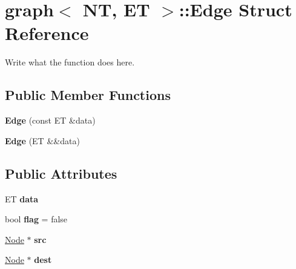 \hypertarget{structgraph_1_1Edge}{\section{graph$<$ N\+T, E\+T $>$\+:\+:Edge Struct Reference}
\label{structgraph_1_1Edge}
}


Write what the function does here.  


\subsection*{Public Member Functions}
\begin{DoxyCompactItemize}
\item 
\hypertarget{structgraph_1_1Edge_aa987146abe580e5d724db07563006fd7}{{\bfseries Edge} (const E\+T \&data)}\label{structgraph_1_1Edge_aa987146abe580e5d724db07563006fd7}

\item 
\hypertarget{structgraph_1_1Edge_af7c871c04c3b03d7e662b950a8875b24}{{\bfseries Edge} (E\+T \&\&data)}\label{structgraph_1_1Edge_af7c871c04c3b03d7e662b950a8875b24}

\end{DoxyCompactItemize}
\subsection*{Public Attributes}
\begin{DoxyCompactItemize}
\item 
\hypertarget{structgraph_1_1Edge_a7246ba3c6e705b5c6ed7eb962b176865}{E\+T {\bfseries data}}\label{structgraph_1_1Edge_a7246ba3c6e705b5c6ed7eb962b176865}

\item 
\hypertarget{structgraph_1_1Edge_a085a367bde22ae09df61053b65b74e06}{bool {\bfseries flag} = false}\label{structgraph_1_1Edge_a085a367bde22ae09df61053b65b74e06}

\item 
\hypertarget{structgraph_1_1Edge_a2609ad21889bbbc55d3425c7aee93d16}{\hyperlink{structgraph_1_1Node}{Node} $\ast$ {\bfseries src}}\label{structgraph_1_1Edge_a2609ad21889bbbc55d3425c7aee93d16}

\item 
\hypertarget{structgraph_1_1Edge_a475664df847e04dc79a93140fd55ca64}{\hyperlink{structgraph_1_1Node}{Node} $\ast$ {\bfseries dest}}\label{structgraph_1_1Edge_a475664df847e04dc79a93140fd55ca64}

\end{DoxyCompactItemize}


